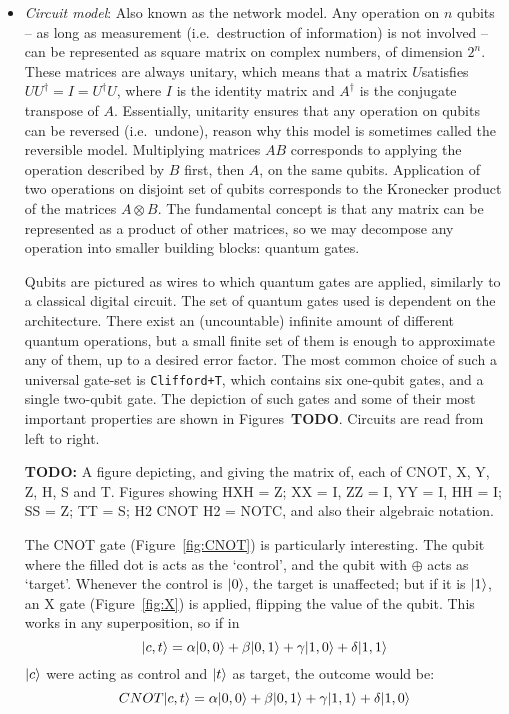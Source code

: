 \begin{itemize}

  \item \textit{Circuit model}: Also known as the network model. Any operation on \(n\) qubits -- as long as measurement (i.e.\ destruction of information) is not involved -- can be represented as square matrix on complex numbers, of dimension \(2^n\). These matrices are always unitary, which means that a matrix \(U\)satisfies \(UU^\dag = I = U^\dag U\), where \(I\) is the identity matrix and \(A^\dag\) is the conjugate transpose of \(A\). Essentially, unitarity ensures that any operation on qubits can be reversed (i.e.\ undone), reason why this model is sometimes called the reversible model. Multiplying matrices \(AB\) corresponds to applying the operation described by \(B\) first, then \(A\), on the same qubits. Application of two operations on disjoint set of qubits corresponds to the Kronecker product of the matrices \(A \otimes B\). The fundamental concept is that any matrix can be represented as a product of other matrices, so we may decompose any operation into smaller building blocks: quantum gates.

  Qubits are pictured as wires to which quantum gates are applied, similarly to a classical digital circuit. The set of quantum gates used is dependent on the architecture. There exist an (uncountable) infinite amount of different quantum operations, but a small finite set of them is enough to approximate any of them, up to a desired error factor. The most common choice of such a universal gate-set is \texttt{Clifford+T}, which contains six one-qubit gates, and a single two-qubit gate. The depiction of such gates and some of their most important properties are shown in Figures~\textbf{TODO}. Circuits are read from left to right.

  \textbf{TODO:} A figure depicting, and giving the matrix of, each of CNOT, X, Y, Z, H, S and T. Figures showing HXH = Z; XX = I, ZZ = I, YY = I, HH = I; SS = Z; TT = S; H2 CNOT H2 = NOTC, and also their algebraic notation.

  The CNOT gate (Figure~\ref{fig:CNOT}) is particularly interesting. The qubit where the filled dot is acts as the `control', and the qubit with \(\oplus\) acts as `target'. Whenever the control is \(\vert 0 \rangle\), the target is unaffected; but if it is \(\vert 1 \rangle\), an X gate (Figure~\ref{fig:X}) is applied, flipping the value of the qubit. This works in any superposition, so if in \[\vert c,t \rangle = \alpha\vert 0,0 \rangle + \beta\vert 0,1 \rangle + \gamma\vert 1,0 \rangle + \delta\vert 1,1 \rangle\] \(\vert c \rangle\) were acting as control and \(\vert t \rangle\) as target, the outcome would be: \[CNOT \vert c,t \rangle = \alpha\vert 0,0 \rangle + \beta\vert 0,1 \rangle + \gamma\vert 1,1 \rangle + \delta\vert 1,0 \rangle\]


\end{itemize}
